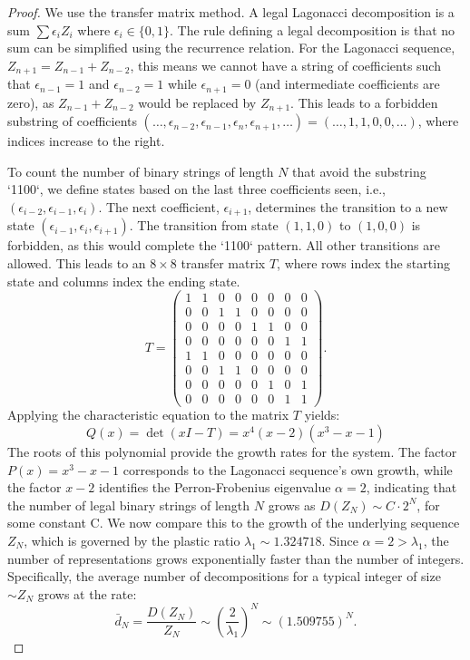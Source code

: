 \documentclass[10pt,a4paper]{amsart}
\begin{document}
	\begin{proof}
		We use the transfer matrix method. A legal Lagonacci decomposition is a sum $\sum \epsilon_i Z_i$ where $\epsilon_i \in \{0,1\}$. The rule defining a legal decomposition is that no sum can be simplified using the recurrence relation. For the Lagonacci sequence, $Z_{n+1} = Z_{n-1} + Z_{n-2}$, this means we cannot have a string of coefficients such that $\epsilon_{n-1}=1$ and $\epsilon_{n-2}=1$ while $\epsilon_{n+1}=0$ (and intermediate coefficients are zero), as $Z_{n-1} + Z_{n-2}$ would be replaced by $Z_{n+1}$. This leads to a forbidden substring of coefficients $(\dots, \epsilon_{n-2}, \epsilon_{n-1}, \epsilon_n, \epsilon_{n+1}, \dots) = (\dots, 1, 1, 0, 0, \dots)$, where indices increase to the right.
		
		To count the number of binary strings of length $N$ that avoid the substring `1100`, we define states based on the last three coefficients seen, i.e., $(\epsilon_{i-2}, \epsilon_{i-1}, \epsilon_i)$. The next coefficient, $\epsilon_{i+1}$, determines the transition to a new state $(\epsilon_{i-1}, \epsilon_i, \epsilon_{i+1})$. The transition from state $(1,1,0)$ to $(1,0,0)$ is forbidden, as this would complete the `1100` pattern. All other transitions are allowed. This leads to an $8 \times 8$ transfer matrix $T$, where rows index the starting state and columns index the ending state.
		\[ T = \begin{pmatrix}
			1 & 1 & 0 & 0 & 0 & 0 & 0 & 0 \\ %
			0 & 0 & 1 & 1 & 0 & 0 & 0 & 0 \\ %
			0 & 0 & 0 & 0 & 1 & 1 & 0 & 0 \\ %
			0 & 0 & 0 & 0 & 0 & 0 & 1 & 1 \\ %
			1 & 1 & 0 & 0 & 0 & 0 & 0 & 0 \\ %
			0 & 0 & 1 & 1 & 0 & 0 & 0 & 0 \\ %
			0 & 0 & 0 & 0 & 0 & 1 & 0 & 1 \\ %
			0 & 0 & 0 & 0 & 0 & 0 & 1 & 1   %
		\end{pmatrix}. \]
		Applying the characteristic equation to the matrix $T$ yields:
		\[ Q(x) = \det(xI - T) = x^4(x - 2)(x^3 - x - 1) \]
		The roots of this polynomial provide the growth rates for the system. The factor $P(x)=x^3 - x - 1$ corresponds to the Lagonacci sequence's own growth, while the factor $x - 2$ identifies the Perron-Frobenius eigenvalue
		\( \alpha = 2 \),  indicating that the number of legal binary strings of length $N$ grows as $D(Z_N) \sim C \cdot 2^N$,
		for some constant C.
		We now compare this to the growth of the underlying sequence $Z_N$, which is governed by the plastic ratio $\lambda_1 \sim 1.324718$. 
		Since $\alpha = 2 > \lambda_1$, the number of representations grows exponentially faster than the number of integers. Specifically, the average number of decompositions for a typical integer of size $\sim Z_N$ grows at the rate:
		\[ \bar{d}_N = \frac{D(Z_N)}{Z_N} \sim \left( \frac{2}{\lambda_1} \right)^N \sim (1.509755)^N. \]
		
	\end{proof}
\end{document}
